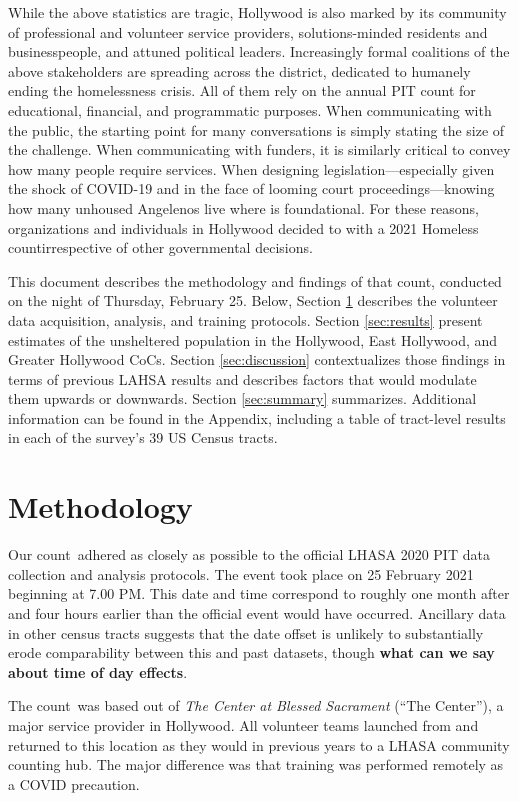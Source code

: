 \documentclass[11pt,twocolumn]{article}
\def\bfr{\bf\color{red}}
\def\Count{count}
\begin{document}
While the above statistics are tragic, Hollywood is also marked by its community of professional
and volunteer service providers, solutions-minded residents and businesspeople, and attuned political 
leaders. Increasingly formal coalitions of the above stakeholders are spreading across the district, dedicated 
to humanely ending the homelessness crisis. All of them rely on the annual PIT count for educational, 
financial, and programmatic purposes. When communicating with the public, the starting point for 
many conversations is simply stating the size of the challenge. When communicating with funders, it is 
similarly critical to convey how many people require services. When designing legislation---especially given 
the shock of COVID-19 and in the face of looming court proceedings---knowing how many unhoused 
Angelenos live where is foundational. For these reasons, organizations and individuals in Hollywood 
decided to with a 2021 Homeless \Count irrespective of other governmental decisions.

This document describes the methodology and findings of that \Count, conducted on the night of 
Thursday, February 25. Below, Section \ref{sec:procedure} describes the volunteer data acquisition, 
analysis, and training protocols. Section \ref{sec:results} present estimates of the unsheltered 
population in the Hollywood, East Hollywood, and Greater Hollywood CoCs. Section \ref{sec:discussion}
contextualizes those findings in terms of previous LAHSA results and describes factors that would
modulate them upwards or downwards. Section \ref{sec:summary} summarizes. Additional information
can be found in the Appendix, including a table of tract-level results in each of the survey's 39 US 
Census tracts.

\section{Methodology}
\label{sec:procedure}

Our \Count\ adhered as closely as possible to the official LHASA 2020 PIT data collection and 
analysis protocols. The event took place on 25 February 2021 beginning at 7.00 PM. This date and time
correspond to roughly one month after and four hours earlier than the official event would have occurred. 
Ancillary data in other census tracts suggests that the date offset is unlikely to substantially erode 
comparability between this and past datasets, though {\bfr what can we say about time of day effects}.

The \Count\ was based out of {\it The Center at Blessed Sacrament} (``The Center''), a major service 
provider in Hollywood. All volunteer teams launched from and returned to this location as they would 
in previous years to a LHASA community counting hub. The major difference was that training was 
performed remotely as a COVID precaution.
\end{document}
